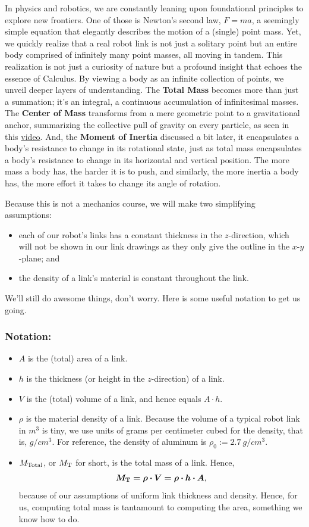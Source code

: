 In physics and robotics, we are constantly leaning upon foundational principles to explore new frontiers. One of those is Newton's second law, \( F = ma \), a seemingly simple equation that elegantly describes the motion of a (single) point mass. Yet, we quickly realize that a real robot link is not just a solitary point but an entire body comprised of infinitely many point masses, all moving in tandem. This realization is not just a curiosity of nature but a profound insight that echoes the essence of Calculus. By viewing a body as an infinite collection of points, we unveil deeper layers of understanding. The \textbf{Total Mass} becomes more than just a summation; it's an integral, a continuous accumulation of infinitesimal masses. The \textbf{Center of Mass} transforms from a mere geometric point to a gravitational anchor, summarizing the collective pull of gravity on every particle, as seen in this \href{https://www.youtube.com/shorts/MUxJAb7TRwI}{video}. And, the \textbf{Moment of Inertia} discussed a bit later, it encapsulates a body's resistance to change in its rotational state, just as total mass encapsulates a body's resistance to change in its horizontal and vertical position. The more mass a body has, the harder it is to push, and similarly, the more inertia a body has, the more effort it takes to change its angle of rotation.


Because this is not a mechanics course, we will make two simplifying assumptions:
\begin{itemize}
    \item each of our robot's links has a constant thickness in the $z$-direction, which will not be shown in our link drawings as they only give the outline in the $x$-$y$-plane; and 
    \item the density of a link's material is constant throughout the link. 
\end{itemize}
We'll still do awesome things, don't worry. Here is some useful notation to get us going. 


\subsubsection{Notation:}
\begin{itemize}
    \item $A$ is the (total) area of a link.
    \item $h$ is the thickness (or height in the $z$-direction) of a link. 
    \item $V$ is the (total) volume of a link, and hence equals $A \cdot h$.
    \item $\rho$ is the material density of a link. Because the volume of a typical robot link in $m^3$ is tiny, we use units of grams per centimeter cubed for the density, that is, $g/cm^3$. For reference, the density of aluminum is $\rho_0:= 2.7~g/cm^3$.
    \item $M_{\rm Total}$, or $M_{\rm T}$ for short, is the total mass of a link. Hence, 
    $$ \bm{M_{\rm T} = \rho \cdot V = \rho \cdot h  \cdot A},$$
    because of our assumptions of uniform link thickness and density. Hence, for us, computing total mass is tantamount to computing the area, something we know how to do.
\end{itemize}

